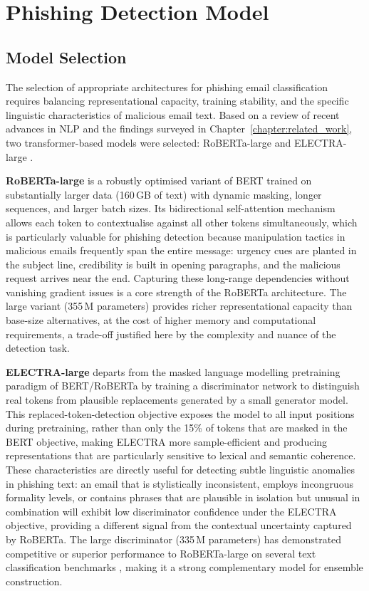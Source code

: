 \chapter{Phishing Detection Model}
\label{chapter:model}

\section{Model Selection}
The selection of appropriate architectures for phishing email classification requires balancing representational capacity, training stability, and the specific linguistic characteristics of malicious email text. Based on a review of recent advances in \ac{NLP} and the findings surveyed in Chapter~\ref{chapter:related_work}, two transformer-based models were selected: \acs{RoBERTa}-large \cite{liu2019roberta} and \acs{ELECTRA}-large \cite{clark2020electra}.

\textbf{\acs{RoBERTa}-large} is a robustly optimised variant of \acs{BERT} trained on substantially larger data (160\,GB of text) with dynamic masking, longer sequences, and larger batch sizes. Its bidirectional self-attention mechanism allows each token to contextualise against all other tokens simultaneously, which is particularly valuable for phishing detection because manipulation tactics in malicious emails frequently span the entire message: urgency cues are planted in the subject line, credibility is built in opening paragraphs, and the malicious request arrives near the end. Capturing these long-range dependencies without vanishing gradient issues is a core strength of the RoBERTa architecture. The large variant (355\,M parameters) provides richer representational capacity than base-size alternatives, at the cost of higher memory and computational requirements, a trade-off justified here by the complexity and nuance of the detection task.

\textbf{\acs{ELECTRA}-large} departs from the masked language modelling pretraining paradigm of BERT/RoBERTa by training a discriminator network to distinguish real tokens from plausible replacements generated by a small generator model. This replaced-token-detection objective exposes the model to all input positions during pretraining, rather than only the 15\% of tokens that are masked in the BERT objective, making ELECTRA more sample-efficient and producing representations that are particularly sensitive to lexical and semantic coherence. These characteristics are directly useful for detecting subtle linguistic anomalies in phishing text: an email that is stylistically inconsistent, employs incongruous formality levels, or contains phrases that are plausible in isolation but unusual in combination will exhibit low discriminator confidence under the ELECTRA objective, providing a different signal from the contextual uncertainty captured by RoBERTa. The large discriminator (335\,M parameters) has demonstrated competitive or superior performance to RoBERTa-large on several text classification benchmarks \cite{clark2020electra}, making it a strong complementary model for ensemble construction.

